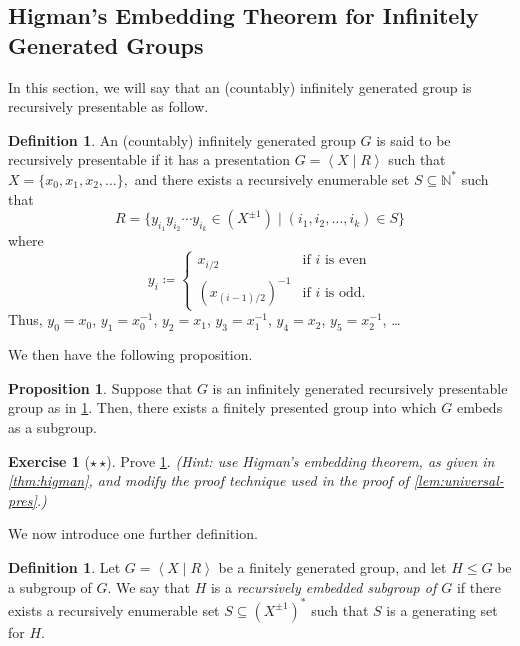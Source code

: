 \documentclass[11pt,a4paper,reqno]{amsart}
\theoremstyle{plain}
\theoremstyle{definition}
\newtheorem{proposition}[theorem]{Proposition}
\newtheorem{definition}[theorem]{Definition}
\theoremstyle{definition}
\newtheorem{exercise}[theorem]{Exercise}
\renewcommand\leq\leqslant
\newcommand\exerciseLevelMedium{$\star${\,}$\star$}
\begin{document}
\subsection{Higman's Embedding Theorem for Infinitely Generated Groups}

In this section, we will say that an (countably) infinitely generated group is recursively presentable as follow.

\begin{definition}\label{def:inf-re-pres}
  An (countably) infinitely generated group $G$ is said to be recursively presentable if it has a presentation $G = \left\langle X \mid R \right\rangle$ such that
  $
    X = \{x_0, x_1, x_2,\ldots\},
  $
  and there exists a recursively enumerable set $S \subseteq \mathbb N^*$ such that
  \[
    R = \{
      y_{i_1} y_{i_2}\cdots y_{i_k}
      \in (X^{\pm 1})
    \mid
      (i_1,i_2,\ldots,i_k)\in S
    \}
  \]
  where
  \[
      y_i \coloneqq
      \begin{cases}
        x_{i/2}&\text{if }i\text{ is even}\\
        \left(x_{(i-1)/2}\right)^{-1}&\text{if }i\text{ is odd}.
      \end{cases}
  \]
  Thus, $y_0 = x_0$, $y_1 = x_0^{-1}$, $y_2 = x_1$, $y_3 = x_1^{-1}$, $y_4 = x_2$, $y_5 = x_2^{-1}$, \ldots
\end{definition}

We then have the following proposition.

\begin{proposition}\label{lem:generalise-higman1}
  Suppose that $G$ is an infinitely generated recursively presentable group as in \cref{def:inf-re-pres}.
  Then, there exists a finitely presented group into which $G$ embeds as a subgroup.
\end{proposition}

\begin{exercise}[\exerciseLevelMedium]
  Prove \cref{lem:generalise-higman1}.
  \textit{(Hint: use Higman's embedding theorem, as given in \cref{thm:higman}, and modify the proof technique used in the proof of \cref{lem:universal-pres}.)}
\end{exercise}

We now introduce one further definition.
\begin{definition}
  Let $G = \left\langle X \mid R\right\rangle$ be a finitely generated group, and let $H\leq G$ be a subgroup of $G$.
  We say that $H$ is a \emph{recursively embedded subgroup of $G$} if there exists a recursively enumerable set $S \subseteq (X^{\pm 1})^*$ such that $S$ is a generating set for $H$.
\end{definition}
\end{document}
